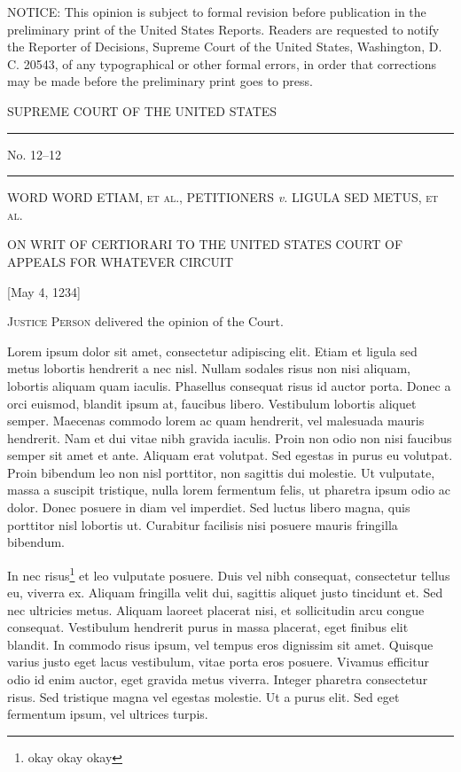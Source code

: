 \documentclass[11pt,twoside]{article}
\begin{document}
{\noindent \scriptsize NOTICE: This opinion is subject to formal
  revision before publication in the preliminary print of the United
  States Reports. Readers are requested to notify the Reporter of
  Decisions, Supreme Court of the United States, Washington, D. C.
  20543, of any typographical or other formal errors, in order that
  corrections may be made before the preliminary print goes to
  press.\par}

\begin{center}

  {\scotusfamily SUPREME COURT OF THE UNITED STATES}

  \rule{2cm}{.4pt}

  {\small No. 12--12}

  \rule{2cm}{.4pt}

  \textsc{WORD WORD ETIAM, et al., PETITIONERS} \emph{v.}
  \textsc{LIGULA SED METUS, et al.}

  \vspace{1ex}

  {\small ON WRIT OF CERTIORARI TO THE UNITED STATES COURT OF APPEALS
    FOR WHATEVER CIRCUIT}

  \vspace{1ex}

  {\small [May 4, 1234]}

\end{center}




\textsc{Justice Person} delivered the opinion of the Court.

Lorem ipsum dolor sit amet, consectetur adipiscing elit. Etiam et ligula sed metus lobortis hendrerit a nec nisl. Nullam sodales risus non nisi aliquam, lobortis aliquam quam iaculis. Phasellus consequat risus id auctor porta. Donec a orci euismod, blandit ipsum at, faucibus libero. Vestibulum lobortis aliquet semper. Maecenas commodo lorem ac quam hendrerit, vel malesuada mauris hendrerit. Nam et dui vitae nibh gravida iaculis. Proin non odio non nisi faucibus semper sit amet et ante. Aliquam erat volutpat. Sed egestas in purus eu volutpat. Proin bibendum leo non nisl porttitor, non sagittis dui molestie. Ut vulputate, massa a suscipit tristique, nulla lorem fermentum felis, ut pharetra ipsum odio ac dolor. Donec posuere in diam vel imperdiet. Sed luctus libero magna, quis porttitor nisl lobortis ut. Curabitur facilisis nisi posuere mauris fringilla bibendum.

In nec risus\footnote{okay okay okay}
et leo vulputate posuere. Duis vel nibh consequat, consectetur tellus eu, viverra ex. Aliquam fringilla velit dui, sagittis aliquet justo tincidunt et. Sed nec ultricies metus. Aliquam laoreet placerat nisi, et sollicitudin arcu congue consequat. Vestibulum hendrerit purus in massa placerat, eget finibus elit blandit. In commodo risus ipsum, vel tempus eros dignissim sit amet. Quisque varius justo eget lacus vestibulum, vitae porta eros posuere. Vivamus efficitur odio id enim auctor, eget gravida metus viverra. Integer pharetra consectetur risus. Sed tristique magna vel egestas molestie. Ut a purus elit. Sed eget fermentum ipsum, vel ultrices turpis.
\end{document}
